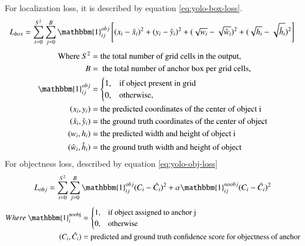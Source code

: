     For localization loss, it is described by equation \ref{eq:yolo-box-loss}.
    \begin{equation}
      L_{box} = \sum_{i=0}^{S^2} \sum_{j=0}^B \mathbbm{1}_{ij}^{obj} \left[(x_i - \hat{x}_i)^2 + (y_i - \hat{y}_i)^2 + (\sqrt{w_i}-\sqrt{\hat{w}_i})^2 + (\sqrt{h_i}-\sqrt{\hat{h}_i})^2\right] \\
      \label{eq:yolo-box-loss}
    \end{equation}
    \begin{align*}
    \text{Where}~S^2  &= \text{the total number of grid cells in the output,}\\
    B &= \text{ the total number of anchor box per grid cells,}\\
    \mathbbm{1}_{ij}^{obj} &= \begin{cases}
                                1, & \text{if object present in grid}\\
                                0, & \text{otherwise,}
                              \end{cases} 
                              \\
    (x_i, y_i) &= \text{the predicted coordinates of the center of object i}\\
    (\hat{x}_i, \hat{y}_i) &= \text{the ground truth coordinates of the center of object}\\
    (w_i, h_i) &= \text{the predicted width and height of object i}\\
    (\hat{w}_i, \hat{h}_i) &= \text{the ground truth width and height of object}
    \end{align*}
    For objectness loss, described by equation \ref{eq:yolo-obj-loss}
    \begin{equation}
      L_{obj} = \sum_{i=0}^{S^2} \sum_{j=0}^B \mathbbm{1}_{ij}^{obj}(C_i - \hat{C}_i)^2  + \alpha \mathbbm{1}_{ij}^{noobj}(C_i - \hat{C}_i)^2
      \label{eq:yolo-obj-loss}
    \end{equation}
    \begin{align*}
    Where~\mathbbm{1}_i^{\text{noobj}} &=\begin{cases} 
                                          1, & \text{if object assigned to anchor j}\\
                                          0, & \text{otherwise} 
                                         \end{cases}\\
          (C_i,\hat{C}_i) &= \text{predicted and ground truth confidence score for objectness of anchor}
    \end{align*}
